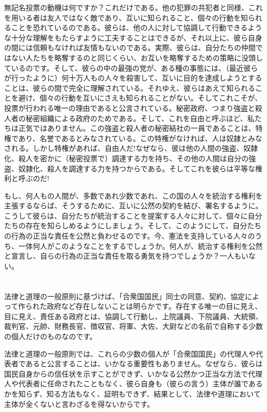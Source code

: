 \documentclass[dvipdfmx, uplatex, tate, landscape]{utbook}
\begin{document}
無記名投票の動機は何ですか？これだけである。他の犯罪の共犯者と同様、これを用いる者は友人ではなく敵であり、互いに知られること、個々の行動を知られることを恐れているのである。彼らは、他の人に対して協調して行動できるような十分な理解をもたらすように工夫することはできるが、それ以上に、彼ら自身の間には信頼もなければ友情もないのである。実際、彼らは、自分たちの仲間ではない人たちを略奪するのと同じくらい、お互いを略奪するための策略に没頭しているのです。そして、彼らの中の最強の党が、ある種の事態には、（最近彼らが行ったように）何十万人もの人々を殺害して、互いに目的を達成しようとすることは、彼らの間で完全に理解されている。それゆえ、彼らはあえて知られることを避け、個々の行動を互いにさえも知られることがない。そしてこれこそが、投票が行われる唯一の理由であると公言されている。秘密政府、つまり強盗と殺人者の秘密組織による政府のためである。そして、これを自由と呼ぶほど、私たちは正気ではありません。この強盗と殺人者の秘密結社の一員であることは、特権であり、名誉であるとみなされている。この特権がなければ、人は奴隷とみなされる。しかし特権があれば、自由人だ!なぜなら、彼は他の人間の強盗、奴隷化、殺人を密かに（秘密投票で）調達する力を持ち、その他の人間は自分の強盗、奴隷化、殺人を調達する力を持つからである。そしてこれを彼らは平等な権利と呼ぶのだ!

もし、何人もの人間が、多数であれ少数であれ、この国の人々を統治する権利を主張するならば、そうするために、互いに公然の契約を結び、署名するように。こうして彼らは、自分たちが統治することを提案する人々に対して、個々に自分たちの存在を知らしめるようにしましょう。そして、このようにして、自分たちの行為の正当な責任を公然と負わせるのです。今、憲法を支持している人々のうち、一体何人がこのようなことをするでしょうか。何人が、統治する権利を公然と宣言し、自らの行為の正当な責任を取る勇気を持つでしょうか？一人もいない。

\chapter{}

法律と道理の一般原則に基づけば、「合衆国国民」同士の同意、契約、協定によって作られた政府など存在しないことは明らかです。存在する唯一の目に見え、目に見え、責任ある政府とは、協調して行動し、上院議員、下院議員、大統領、裁判官、元帥、財務長官、徴収官、将軍、大佐、大尉などの名前で自称する少数の個人だけのものなのです。

法律と道理の一般原則では、これらの少数の個人が「合衆国国民」の代理人や代表者であると公言することは、いかなる重要性もありません。なぜなら、彼らは国民自身からの信任状を示すことができず、いかなる公然かつ正当な方法で代理人や代表者に任命されたこともなく、彼ら自身も（彼らの言う）主体が誰であるかを知らず、知る方法もなく、証明もできず、結果として、法律や道理において主体が全くないと言わざるを得ないからです。
\end{document}
